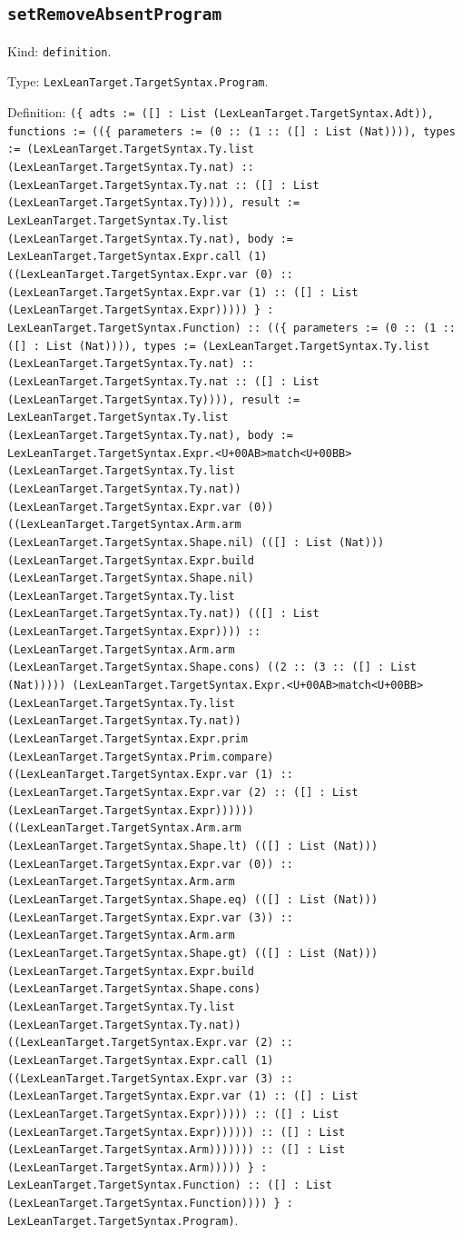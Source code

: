 \documentclass[11pt]{article}
\begin{document}
\subsection*{\texttt{setRemoveAbsentProgram}}
\noindent Kind: \texttt{definition}.\par
\noindent Type: \texttt{LexLeanTarget.TargetSyntax.Program}.\par
\noindent Definition: \texttt{(\{ adts := ([] : List (LexLeanTarget.TargetSyntax.Adt)), functions := ((\{ parameters := (0 :: (1 :: ([] : List (Nat)))), types := (LexLeanTarget.TargetSyntax.Ty.list (LexLeanTarget.TargetSyntax.Ty.nat) :: (LexLeanTarget.TargetSyntax.Ty.nat :: ([] : List (LexLeanTarget.TargetSyntax.Ty)))), result := LexLeanTarget.TargetSyntax.Ty.list (LexLeanTarget.TargetSyntax.Ty.nat), body := LexLeanTarget.TargetSyntax.Expr.call (1) ((LexLeanTarget.TargetSyntax.Expr.var (0) :: (LexLeanTarget.TargetSyntax.Expr.var (1) :: ([] : List (LexLeanTarget.TargetSyntax.Expr))))) \} : LexLeanTarget.TargetSyntax.Function) :: ((\{ parameters := (0 :: (1 :: ([] : List (Nat)))), types := (LexLeanTarget.TargetSyntax.Ty.list (LexLeanTarget.TargetSyntax.Ty.nat) :: (LexLeanTarget.TargetSyntax.Ty.nat :: ([] : List (LexLeanTarget.TargetSyntax.Ty)))), result := LexLeanTarget.TargetSyntax.Ty.list (LexLeanTarget.TargetSyntax.Ty.nat), body := LexLeanTarget.TargetSyntax.Expr.<U+00AB>match<U+00BB> (LexLeanTarget.TargetSyntax.Ty.list (LexLeanTarget.TargetSyntax.Ty.nat)) (LexLeanTarget.TargetSyntax.Expr.var (0)) ((LexLeanTarget.TargetSyntax.Arm.arm (LexLeanTarget.TargetSyntax.Shape.nil) (([] : List (Nat))) (LexLeanTarget.TargetSyntax.Expr.build (LexLeanTarget.TargetSyntax.Shape.nil) (LexLeanTarget.TargetSyntax.Ty.list (LexLeanTarget.TargetSyntax.Ty.nat)) (([] : List (LexLeanTarget.TargetSyntax.Expr)))) :: (LexLeanTarget.TargetSyntax.Arm.arm (LexLeanTarget.TargetSyntax.Shape.cons) ((2 :: (3 :: ([] : List (Nat))))) (LexLeanTarget.TargetSyntax.Expr.<U+00AB>match<U+00BB> (LexLeanTarget.TargetSyntax.Ty.list (LexLeanTarget.TargetSyntax.Ty.nat)) (LexLeanTarget.TargetSyntax.Expr.prim (LexLeanTarget.TargetSyntax.Prim.compare) ((LexLeanTarget.TargetSyntax.Expr.var (1) :: (LexLeanTarget.TargetSyntax.Expr.var (2) :: ([] : List (LexLeanTarget.TargetSyntax.Expr)))))) ((LexLeanTarget.TargetSyntax.Arm.arm (LexLeanTarget.TargetSyntax.Shape.lt) (([] : List (Nat))) (LexLeanTarget.TargetSyntax.Expr.var (0)) :: (LexLeanTarget.TargetSyntax.Arm.arm (LexLeanTarget.TargetSyntax.Shape.eq) (([] : List (Nat))) (LexLeanTarget.TargetSyntax.Expr.var (3)) :: (LexLeanTarget.TargetSyntax.Arm.arm (LexLeanTarget.TargetSyntax.Shape.gt) (([] : List (Nat))) (LexLeanTarget.TargetSyntax.Expr.build (LexLeanTarget.TargetSyntax.Shape.cons) (LexLeanTarget.TargetSyntax.Ty.list (LexLeanTarget.TargetSyntax.Ty.nat)) ((LexLeanTarget.TargetSyntax.Expr.var (2) :: (LexLeanTarget.TargetSyntax.Expr.call (1) ((LexLeanTarget.TargetSyntax.Expr.var (3) :: (LexLeanTarget.TargetSyntax.Expr.var (1) :: ([] : List (LexLeanTarget.TargetSyntax.Expr))))) :: ([] : List (LexLeanTarget.TargetSyntax.Expr)))))) :: ([] : List (LexLeanTarget.TargetSyntax.Arm))))))) :: ([] : List (LexLeanTarget.TargetSyntax.Arm))))) \} : LexLeanTarget.TargetSyntax.Function) :: ([] : List (LexLeanTarget.TargetSyntax.Function)))) \} : LexLeanTarget.TargetSyntax.Program)}.\par
\end{document}
